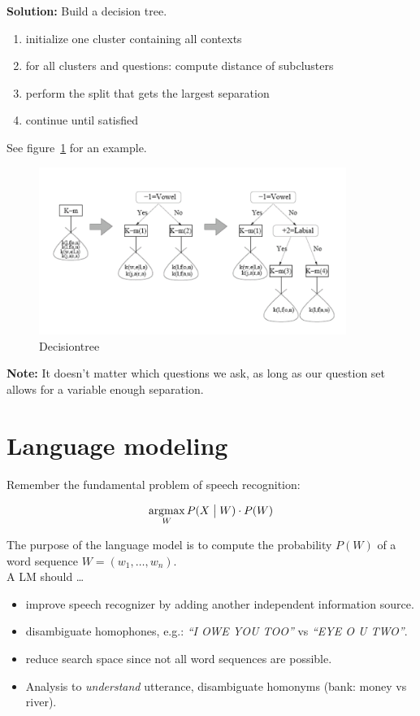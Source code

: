 \textbf{Solution:} Build a decision tree.

\vspace{10pt}

\begin{enumerate}
    \item initialize one cluster containing all contexts
    \item for all clusters and questions: compute distance of subclusters
    \item perform the split that gets the largest separation
    \item continue until satisfied
\end{enumerate}

See figure~\ref{fig:growDecisionTree} for an example.

\begin{figure}[ht]
\centering
\includegraphics[width=10cm]{images/decision.png}
\caption{Decisiontree}
\label{fig:growDecisionTree}
\end{figure}

\textbf{Note:} It doesn't matter which questions we ask, as long as our question set allows for a variable enough separation.

\newpage

\section{Language modeling}

Remember the fundamental problem of speech recognition:

\[
    \operatorname*{\arg\!\max}_W P(X \bigm| W) \cdot P(W)
\]

The purpose of the language model is to compute the probability $P(W)$ of a word sequence $W = (w_1, \ldots, w_n)$. \\
A LM should \dots
\begin{itemize}
\item improve speech recognizer by adding another independent information source.
\item disambiguate homophones, e.g.: \textit{``I OWE YOU TOO''} vs \textit{``EYE O U TWO''}.
\item reduce search space since not all word sequences are possible.
\item Analysis to \emph{understand} utterance, disambiguate homonyms (bank: money vs river).
\end{itemize}

